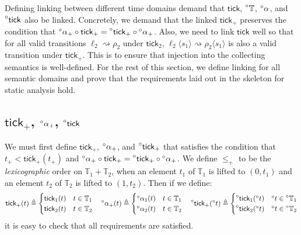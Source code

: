 \documentclass[acmsmall,review]{acmart}\settopmatter{printfolios=true,printccs=false,printacmref=false}
\theoremstyle{definition}
\theoremstyle{plain}
\newcommand*{\A}[1]{\prescript{\circ}{}{#1}}
\newcommand*{\Time}{\mathbb{T}}
\newcommand*{\semarrow}{\rightsquigarrow}
\newcommand*{\tick}{\mathsf{tick}}
\newcommand*{\inject}[2]{{#2}\langle{#1}\rangle}
\begin{document}
Defining linking between different time domains demand that $\tick$, $\A\Time$, $\A\alpha$, and $\A\tick$ also be linked.
Concretely, we demand that the linked $\tick_+$ preserves the condition that $\A\alpha_+\circ\tick_+=\A\tick_+\circ\A\alpha_+$.
Also, we need to link $\tick$ well so that for all valid transitions $\ell_2\semarrow\rho_2$ under $\tick_2$, $\inject{s_1}{\ell_2}\semarrow\inject{s_1}{\rho_2}$ is also a valid transition under $\tick_+$.
This is to ensure that injection into the collecting semantics is well-defined.
For the rest of this section, we define linking for all semantic domains and prove that the requirements laid out in the skeleton for static analysis hold.

\subsection{$\tick_+$, $\A\alpha_+$, $\A\tick$}
We must first define $\tick_+$, $\A\alpha_+$, and $\A\tick_+$ that satisfies the condition that $t_+<\tick_+(t_+)$ and $\A\alpha_+\circ\tick_+=\A\tick_+\circ\A\alpha_+$.
We define $\le_+$ to be the \emph{lexicographic} order on $\Time_1+\Time_2$, when an element $t_1$ of $\Time_1$ is lifted to $(0,t_1)$ and an element $t_2$ of $\Time_2$ is lifted to $(1,t_2)$.
Then if we define:
\[
  \tick_+(t)\triangleq
  \begin{cases}
    \tick_1(t) & t\in\Time_1 \\
    \tick_2(t) & t\in\Time_2
  \end{cases}\quad
  \A\alpha_+(t)\triangleq
  \begin{cases}
    \A\alpha_1(t) & t\in\Time_1 \\
    \A\alpha_2(t) & t\in\Time_2
  \end{cases}\quad
  \A\tick_+(\A{t})\triangleq
  \begin{cases}
    \A\tick_1(\A{t}) & \A{t}\in\A\Time_1 \\
    \A\tick_2(\A{t}) & \A{t}\in\A\Time_2
  \end{cases}
\]
it is easy to check that all requirements are satisfied.
\end{document}
